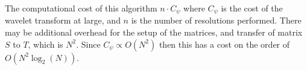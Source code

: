 The computational cost of this algorithm $n\cdot C_\psi$  where $C_\psi$ is the cost of the wavelet transform at large, and $n$ is the number of resolutions performed.  There may be additional overhead for the setup of the matrices, and transfer of matrix $S$ to $T$, which is $N^2$.  Since $C_\psi \propto O(N^2)$ then this has a cost on the order of $O(N^2\log_2(N))$.













